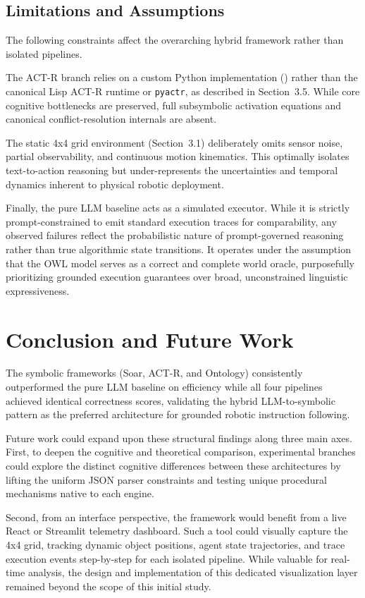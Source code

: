 \documentclass[a4paper]{article}
\begin{document}
\subsection{Limitations and Assumptions}
The following constraints affect the overarching hybrid framework rather than isolated pipelines.

The ACT-R branch relies on a custom Python implementation () rather than the canonical Lisp ACT-R runtime or \texttt{pyactr}, as described in Section~3.5. While core cognitive bottlenecks are preserved, full subsymbolic activation equations and canonical conflict-resolution internals are absent.

The static 4x4 grid environment (Section~3.1) deliberately omits sensor noise, partial observability, and continuous motion kinematics. This optimally isolates text-to-action reasoning but under-represents the uncertainties and temporal dynamics inherent to physical robotic deployment.

Finally, the pure LLM baseline acts as a simulated executor. While it is strictly prompt-constrained to emit standard execution traces for comparability, any observed failures reflect the probabilistic nature of prompt-governed reasoning rather than true algorithmic state transitions. It operates under the assumption that the OWL model serves as a correct and complete world oracle, purposefully prioritizing grounded execution guarantees over broad, unconstrained linguistic expressiveness.

\section{Conclusion and Future Work}

The symbolic frameworks (Soar, ACT-R, and Ontology) consistently outperformed the pure LLM baseline on efficiency while all four pipelines achieved identical correctness scores, validating the hybrid LLM-to-symbolic pattern as the preferred architecture for grounded robotic instruction following.

Future work could expand upon these structural findings along three main axes. First, to deepen the cognitive and theoretical comparison, experimental branches could explore the distinct cognitive differences between these architectures by lifting the uniform JSON parser constraints and testing unique procedural mechanisms native to each engine.

Second, from an interface perspective, the framework would benefit from a live React or Streamlit telemetry dashboard. Such a tool could visually capture the 4x4 grid, tracking dynamic object positions, agent state trajectories, and trace execution events step-by-step for each isolated pipeline. While valuable for real-time analysis, the design and implementation of this dedicated visualization layer remained beyond the scope of this initial study.
\end{document}

